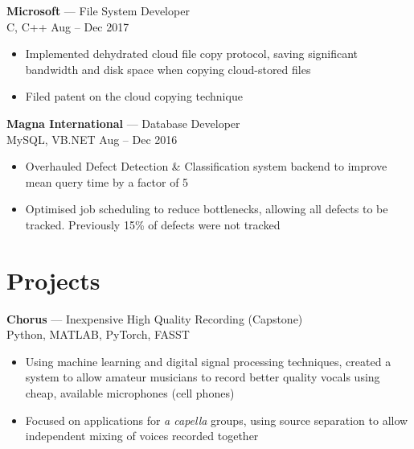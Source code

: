 \documentclass[letterpaper,10pt]{article}
\newcommand{\comment}[1]{}
\newcommand{\jobtitle}[4]{
    {\large \textbf{#1} --- #2\\}
    {\footnotesize#3 \hfill #4}
}
\begin{document}
\begin{minipage}[t]{0.6\textwidth}
\begin{itemize}
\comment{TODO: Impact statements. Double indented list?}

\end{itemize}
\bigskip

\jobtitle{Microsoft}{File System Developer}{C, C++ }{Aug -- Dec 2017}
\begin{itemize}
    \item {Implemented dehydrated cloud file copy protocol, saving significant bandwidth and disk space when copying cloud-stored files}
    \item {Filed patent on the cloud copying technique}   %
\end{itemize}
\bigskip

\jobtitle{Magna International}{Database Developer}{MySQL, VB.NET}{Aug -- Dec 2016}
\begin{itemize}
    \item {Overhauled Defect Detection \& Classification system backend to improve mean query time by a factor of 5}
    \item {Optimised job scheduling to reduce bottlenecks, allowing all defects to be tracked. Previously 15\% of defects were not tracked}
\end{itemize}
\bigskip

\section{Projects}
\smallskip
{\large
\textbf{Chorus} --- Inexpensive High Quality Recording (Capstone) \\
}
{\footnotesize
Python, MATLAB, PyTorch, FASST
}
\begin{itemize}
	\item {Using machine learning and digital signal processing techniques, created a system to allow amateur musicians to record better quality vocals using cheap, available microphones (cell phones)}
    \item {Focused on applications for \textit{a capella} groups, using source separation to allow independent mixing of voices recorded together}
\end{itemize}

\bigskip

\comment{todo: MHCT?}

\comment{
{\large
\textbf{UW Autonomous Sailboat Team}\\
}
{\footnotesize
Python
}
\begin{itemize}
	\item {Implemented autonomous path planning software for round-the-buoys races on a 2 metre model sailboat}
    \item {Created automatic sail trim system in hardware}
\end{itemize}
}

\end{minipage}
\end{document}
